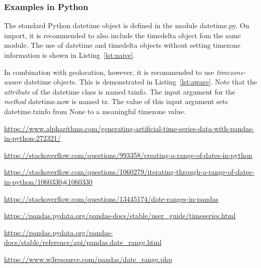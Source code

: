\subsubsection{Examples in Python}

The standard Python \textsf{datetime} object is defined in the module \textsf{datetime.py}. On import, it is recommended to also include the \textsf{timedelta} object fom the same module. The use of \textsf{datetime} and \textsf{timedelta} objects without setting timezone information is shown in Listing~\ref*{lst:naive}.

%

In combination with geolocation, however, it is recommended to use \emph{timezone-aware} \textsf{datetime} objects. This is demonstrated in Listing~\ref*{lst:aware}. Note that the \emph{attribute} of the \textsf{datetime} class is named \textsf{tzinfo}. The input argument for the \emph{method} \textsf{datetime.now} is named \textsf{tz}. The value of this input argument sets \textsf{datetime.tzinfo} from \textsf{None} to a meaningful \textsf{timezone} value.

%

%

\url{https://www.alpharithms.com/generating-artificial-time-series-data-with-pandas-in-python-272321/}

\url{https://stackoverflow.com/questions/993358/creating-a-range-of-dates-in-python}

\url{https://stackoverflow.com/questions/1060279/iterating-through-a-range-of-dates-in-python/1060330#1060330}

\url{https://stackoverflow.com/questions/13445174/date-ranges-in-pandas}

\url{https://pandas.pydata.org/pandas-docs/stable/user_guide/timeseries.html}

\url{https://pandas.pydata.org/pandas-docs/stable/reference/api/pandas.date_range.html}

\url{https://www.w3resource.com/pandas/date_range.php}



